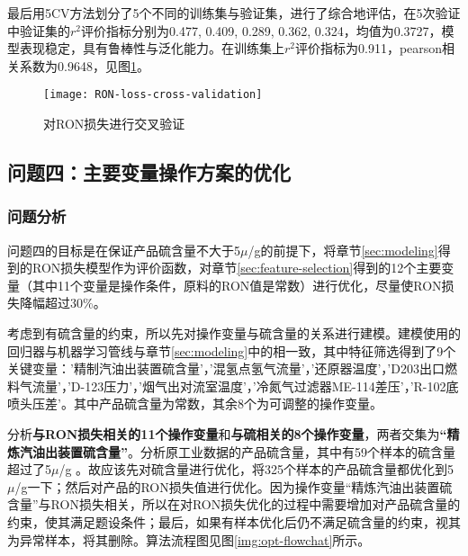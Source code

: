\documentclass[bwprint]{gmcmthesis}
\begin{document}
最后用5CV方法划分了5个不同的训练集与验证集，进行了综合地评估，在5次验证中验证集的$r^2$评价指标分别为0.477, 0.409, 0.289, 0.362, 0.324，均值为0.3727，模型表现稳定，具有鲁棒性与泛化能力。在训练集上$r^2$评价指标为0.911，pearson相关系数为0.9648，见图\ref{RON-loss-cv}。

\begin{figure}[htb]
	\centering
	\texttt{[image: RON-loss-cross-validation]}
	\caption{对RON损失进行交叉验证}
	\label{RON-loss-cv}
\end{figure}



\FloatBarrier
\subsection{问题四：主要变量操作方案的优化}

\FloatBarrier
\subsubsection{问题分析}\label{sec:opt-problem-analyze}


问题四的目标是在保证产品硫含量不大于5$\mu$/g的前提下，将章节\ref{sec:modeling}得到的RON损失模型作为评价函数，对章节\ref{sec:feature-selection}得到的12个主要变量（其中11个变量是操作条件，原料的RON值是常数）进行优化，尽量使RON损失降幅超过30\%。


考虑到有硫含量的约束，所以先对操作变量与硫含量的关系进行建模。建模使用的回归器与机器学习管线与章节\ref{sec:modeling}中的相一致，其中特征筛选得到了9个关键变量：'精制汽油出装置硫含量'，'混氢点氢气流量'，'还原器温度'，'D203出口燃料气流量'，'D-123压力'，'烟气出对流室温度'，'冷氮气过滤器ME-114差压'，'R-102底喷头压差'。其中产品硫含量为常数，其余8个为可调整的操作变量。

分析\textbf{与RON损失相关的11个操作变量}和\textbf{与硫相关的8个操作变量}，两者交集为\textbf{“精炼汽油出装置硫含量”}。分析原工业数据的产品硫含量，其中有59个样本的硫含量超过了5$\mu$/g 。故应该先对硫含量进行优化，将325个样本的产品硫含量都优化到5$\mu$/g一下；然后对产品的RON损失值进行优化。因为操作变量“精炼汽油出装置硫含量”与RON损失相关，所以在对RON损失优化的过程中需要增加对产品硫含量的约束，使其满足题设条件；最后，如果有样本优化后仍不满足硫含量的约束，视其为异常样本，将其删除。算法流程图见图\ref{img:opt-flowchat}所示。
\end{document}
